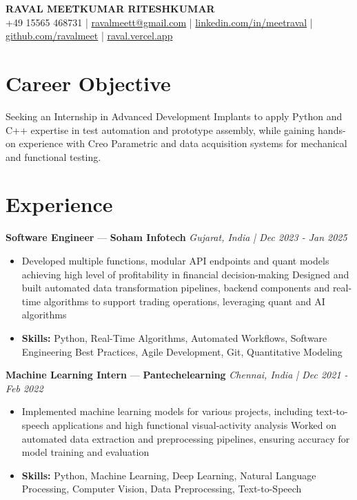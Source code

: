 \documentclass[a4paper,10pt]{article}
\begin{document}
\begin{center}
  {\Large\bfseries RAVAL MEETKUMAR RITESHKUMAR}\\[2pt]
  {\small +49 15565 468731 \;|\; \href{mailto:ravalmeett@gmail.com}{ravalmeett@gmail.com} \;|\; \href{https://www.linkedin.com/in/meetraval/}{linkedin.com/in/meetraval} \;|\; \href{https://github.com/ravalmeet}{github.com/ravalmeet} \;|\; \href{https://raval.vercel.app/}{raval.vercel.app}}
\end{center}
\vspace{-3pt}

\section*{Career Objective}
Seeking an Internship in Advanced Development Implants to apply Python and C++ expertise in test automation and prototype assembly, while gaining hands-on experience with Creo Parametric and data acquisition systems for mechanical and functional testing.\par

\section*{Experience}
\textbf{Software Engineer} — \textbf{Soham Infotech} \hfill \textit{Gujarat, India \;|\; Dec 2023 - Jan 2025}\par
\vspace{1pt}
\begin{itemize}
  \item Developed multiple functions, modular API endpoints and quant models achieving high level of profitability in financial decision-making Designed and built automated data transformation pipelines, backend components and real-time algorithms to support trading operations, leveraging quant and AI algorithms
  \item \textbf{Skills:} Python, Real-Time Algorithms, Automated Workflows, Software Engineering Best Practices, Agile Development, Git, Quantitative Modeling
\end{itemize}
\vspace{3pt}
\textbf{Machine Learning Intern} — \textbf{Pantechelearning} \hfill \textit{Chennai, India \;|\; Dec 2021 - Feb 2022}\par
\vspace{1pt}
\begin{itemize}
  \item Implemented machine learning models for various projects, including text-to-speech applications and high functional visual-activity analysis Worked on automated data extraction and preprocessing pipelines, ensuring accuracy for model training and evaluation
  \item \textbf{Skills:} Python, Machine Learning, Deep Learning, Natural Language Processing, Computer Vision, Data Preprocessing, Text-to-Speech
\end{itemize}
\end{document}
